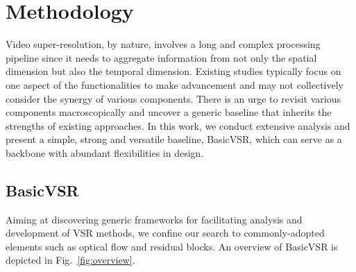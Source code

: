\documentclass[final]{cvpr}
\begin{document}
 \section{Methodology}
Video super-resolution, by nature, involves a long and complex processing pipeline since it needs to aggregate information from not only the spatial dimension but also the temporal dimension. Existing studies typically focus on one aspect of the functionalities to make advancement and may not collectively consider the synergy of various components.
There is an urge to revisit various components macroscopically and uncover a generic baseline that inherits the strengths of existing approaches. In this work, we conduct extensive analysis and present a simple, strong and versatile baseline, BasicVSR, which can serve as a backbone with abundant flexibilities in design.

\subsection{\mbox{BasicVSR}}
\label{sec:basicvsr}
Aiming at discovering generic frameworks for facilitating analysis and development of VSR methods, we confine our search to commonly-adopted elements such as optical flow and residual blocks. An overview of \mbox{BasicVSR} is depicted in Fig.~\ref{fig:overview}.
\end{document}
